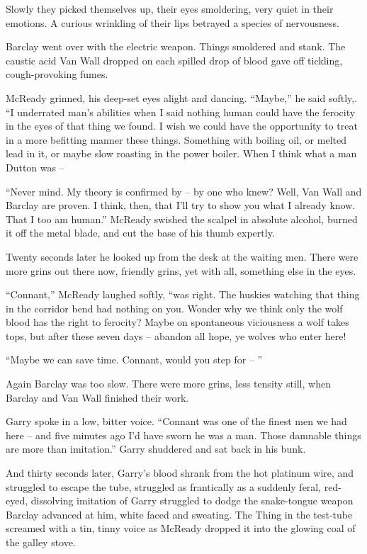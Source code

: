 \documentclass[letterpaper,openany,12pt]{memoir}		%
\begin{document}
Slowly they picked themselves up, their eyes smoldering, very quiet in their
emotions. A curious wrinkling of their lips betrayed a species of nervousness.

Barclay went over with the electric weapon. Things smoldered and stank. The
caustic acid Van Wall dropped on each spilled drop of blood gave off tickling,
cough-provoking fumes.

McReady grinned, his deep-set eyes alight and dancing. ``Maybe,'' he said
softly,. ``I underrated man's abilities when I said nothing human could have the
ferocity in the eyes of that thing we found. I wish we could have the
opportunity to treat in a more befitting manner these things. Something with
boiling oil, or melted lead in it, or maybe slow roasting in the power boiler.
When I think what a man Dutton was --

``Never mind. My theory is confirmed by -- by one who knew? Well, Van Wall and
Barclay are proven. I think, then, that I'll try to show you what I already
know. That I too am human.'' McReady swished the scalpel in absolute alcohol,
burned it off the metal blade, and cut the base of his thumb expertly.

Twenty seconds later he looked up from the desk at the waiting men. There were
more grins out there now, friendly grins, yet with all, something else in the
eyes.

``Connant,'' McReady laughed softly, ``was right. The huskies watching that
thing in the corridor bend had nothing on you. Wonder why we think only the wolf
blood has the right to ferocity? Maybe on spontaneous viciousness a wolf takes
tops, but after these seven days -- abandon all hope, ye wolves who enter here!

``Maybe we can save time. Connant, would you step for -- ''

Again Barclay was too slow. There were more grins, less tensity still, when
Barclay and Van Wall finished their work.

Garry spoke in a low, bitter voice. ``Connant was one of the finest men we had
here -- and five minutes ago I'd have sworn he was a man. Those damnable things
are more than imitation.'' Garry shuddered and sat back in his bunk.

And thirty seconds later, Garry's blood shrank from the hot platinum wire, and
struggled to escape the tube, struggled as frantically as a suddenly feral,
red-eyed, dissolving imitation of Garry struggled to dodge the snake-tongue
weapon Barclay advanced at him, white faced and sweating. The Thing in the
test-tube screamed with a tin, tinny voice as McReady dropped it into the
glowing coal of the galley stove.
\end{document}
